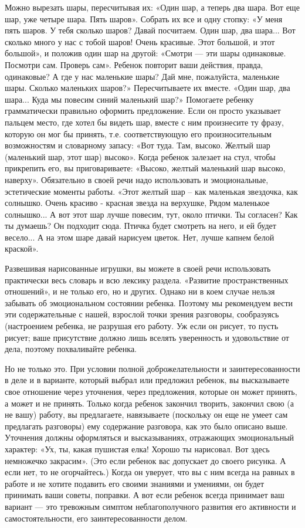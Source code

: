 \documentclass[a5paper]{book}
\begin{document}
Можно вырезать шары, пересчитывая их: «Один шар, а теперь два шара. Вот
еще шар, уже четыре шара. Пять шаров». Собрать их все и одну стопку: «У
меня пять шаров. У тебя сколько шаров? Давай посчитаем. Один шар, два
шара... Вот сколько много у нас с тобой шаров! Очень красивые. Этот
большой, и этот большой», и положив один шар на другой: «Смотри --- эти
шары одинаковые. Посмотри сам. Проверь сам». Ребенок повторит ваши
действия, правда, одинаковые? А где у нас маленькие шары? Дай мне,
пожалуйста, маленькие шары. Сколько маленьких шаров?» Пересчитываете их
вместе. «Один шар, два шара... Куда мы повесим синий маленький шар?»
Помогаете ребенку грамматически правильно оформить предложение. Если он
просто указывает пальцем место, где хотел бы видеть шар, вместе с ним
произнесите ту фразу, которую он мог бы принять, т.е. соответствующую
его произносительным возможностям и словарному запасу: «Вот туда. Там,
высоко. Желтый шар (маленький шар, этот шар) высоко». Когда ребенок
залезает на стул, чтобы прикрепить его, вы приговариваете: «Высоко,
желтый маленький шар высоко, наверху». Обязательно в своей речи надо
использовать и эмоциональные, эстетические моменты работы. «Этот желтый
шар -- как маленькая звездочка, как солнышко. Очень красиво - красная
звезда на верхушке, Рядом маленькое солнышко... А вот этот шар лучше
повесим, тут, около птички. Ты согласен? Как ты думаешь? Он подходит
сюда. Птичка будет смотреть на него, и ей будет весело... А на этом шаре
давай нарисуем цветок. Нет, лучше капнем белой краской».

Развешивая нарисованные игрушки, вы можете в своей речи использовать
практически весь словарь и всю лексику раздела. «Развитие
пространственных отношений», и не только его, но и других. Однако ни в
коем случае нельзя забывать об эмоциональном состоянии ребенка. Поэтому
мы рекомендуем вести эти содержательные с нашей, взрослой точки зрения
разговоры, сообразуясь (настроением ребенка, не разрушая его работу. Уж
если он рисует, то пусть рисует; ваше присутствие должно лишь вселять
уверенность и удовольствие от дела, поэтому похваливайте ребенка.

Но не только это. При условии полной доброжелательности и
заинтересованности в деле и в варианте, который выбрал или предложил
ребенок, вы высказываете свое отношение через уточнения, через
предложения, которые он может принять, а может и не принять. Только
когда ребенок закончил творить, закончил свою (а не вашу) работу, вы
предлагаете, навязываете (поскольку он еще не умеет сам предлагать
разговоры) ему содержание разговора, как это было описано выше.
Уточнения должны оформляться и высказываниях, отражающих эмоциональный
характер: «Ух, ты, какая пушистая елка! Хорошо ты нарисовал. Вот здесь
немножечко закрасим». (Это если ребенок вас допускает до своего рисунка.
А если нет, то не огорчайтесь.) Когда он уверует, что вы с ним всегда на
равных в работе и не хотите подавить его своими знаниями и умениями, он
будет принимать ваши советы, поправки. А вот если ребенок всегда
принимает ваш вариант --- это тревожным симптом неблагополучного
развития его активности и самостоятельности, его заинтересованности
делом.
\end{document}
